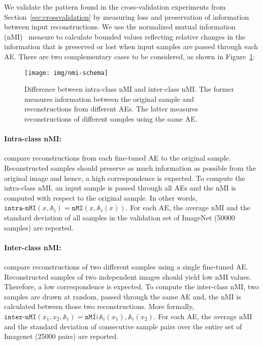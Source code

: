 \documentclass[10pt,twocolumn,a4paper]{article}
\newcommand{\autoe}[1]{\mathbb{A}_{#1}}
\begin{document}
We validate the pattern found in the cross-validation experiments from Section~\ref{sec:crossvalidation} by measuring loss and preservation of information between input reconstructions.
We use the normalized mutual information (nMI)~\cite{strehl2002cluster} measure to calculate bounded values reflecting relative changes in the information that is preserved or lost when input samples are passed through each AE.
There are two complementary cases to be considered, as shown in Figure~\ref{fig:nmi-idea}:

\begin{figure}
	\centering
	\texttt{[image: img/nmi-schema]}
	\caption{Difference between intra-class nMI and inter-class nMI. The former measures information between the original sample and reconstructions from different AEs. The latter measures reconstructions of different samples using the same AE.}
	\label{fig:nmi-idea}
\end{figure}\vspace{-1.5em}\paragraph{Intra-class nMI:} compare reconstructions from each fine-tuned AE to the original sample.
Reconstructed samples should preserve as much information as possible from the original image and hence, a high correspondence is expected.
To compute the intra-class nMI, an input sample is passed through all AEs and the nMI is computed with respect to the original sample.
In other words, $\texttt{intra-nMI}(x, \autoe{i}) = \texttt{nMI}(x, \autoe{i}(x))$.
For each AE, the average nMI and the standard deviation of all samples in the validation set of ImageNet (50000 samples) are reported.

\vspace{-1.5em}\paragraph{Inter-class nMI:} compare reconstructions of two different samples using a single fine-tuned AE.
Reconstructed samples of two independent images should yield low nMI values.
Therefore, a low correspondence is expected.
To compute the inter-class nMI, two samples are drawn at random, passed through the same AE and, the nMI is calculated between those two reconstructions.
More formally, $\texttt{inter-nMI}(x_1, x_2, \autoe{i}) = \texttt{nMI}(\autoe{i}(x_1), \autoe{i}(x_2)$.
For each AE, the average nMI and the standard deviation of consecutive sample pairs over the entire set of Imagenet (25000 pairs) are reported.
\end{document}
